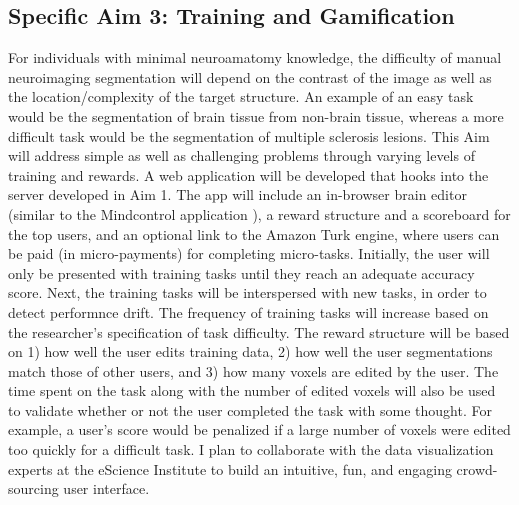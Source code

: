 

\subsection*{Specific Aim 3: Training and Gamification}

For individuals with minimal neuroamatomy knowledge, the difficulty of manual neuroimaging segmentation will depend on the contrast of the image as well as the location/complexity of the target structure. An example of an easy task would be the segmentation of brain tissue from non-brain tissue, whereas a more difficult task would be the segmentation of multiple sclerosis lesions. This Aim will address simple as well as challenging problems through varying levels of training and rewards. A web application will be developed that hooks into the server developed in Aim 1. The app will include an in-browser brain editor (similar to the Mindcontrol application \cite{keshavan2016mindcontrol}), a reward structure and a scoreboard for the top users, and an optional link to the Amazon Turk engine, where users can be paid (in micro-payments) for completing micro-tasks. Initially, the user will only be presented with training tasks until they reach an adequate accuracy score. Next, the training tasks will be interspersed with new tasks, in order to detect performnce drift. The frequency of training tasks will increase based on the researcher's specification of task difficulty. The reward structure will be based on 1) how well the user edits training data, 2) how well the user segmentations match those of other users, and 3) how many voxels are edited by the user. The time spent on the task along with the number of edited voxels will also be used to validate whether or not the user completed the task with some thought. For example, a user's score would be penalized if a large number of voxels were edited too quickly for a difficult task. I plan to collaborate with the data visualization experts at the eScience Institute to build an intuitive, fun, and engaging crowd-sourcing user interface.